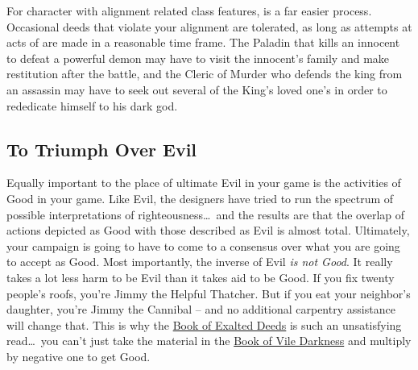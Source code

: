 For character with alignment related class features,  is a far easier process. Occasional deeds that violate your alignment are tolerated, as long as attempts at acts of  are made in a reasonable time frame. The Paladin that kills an innocent to defeat a powerful demon may have to visit the innocent's family and make restitution after the battle, and the Cleric of Murder who defends the king from an assassin may have to seek out several of the King's loved one's in order to rededicate himself to his dark god.




\subsection{To Triumph Over Evil}

Equally important to the place of ultimate Evil in your game is the activities of Good in your game. Like Evil, the designers have tried to run the spectrum of possible interpretations of righteousness\ldots\  and the results are that the overlap of actions depicted as Good with those described as Evil is almost total. Ultimately, your campaign is going to have to come to a consensus over what you are going to accept as Good. Most importantly, the inverse of Evil \textit{is not Good}. It really takes a lot less harm to be Evil than it takes aid to be Good. If you fix twenty people's roofs, you're Jimmy the Helpful Thatcher. But if you eat your neighbor's daughter, you're Jimmy the Cannibal -- and no additional carpentry assistance will change that. This is why the \underline{Book of Exalted Deeds} is such an unsatisfying read\ldots\  you can't just take the material in the \underline{Book of Vile Darkness} and multiply by negative one to get Good.


